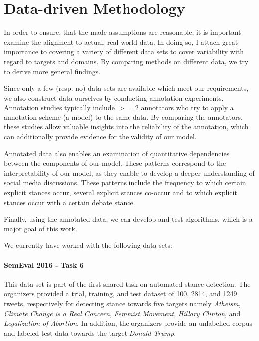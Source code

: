 \documentclass[11pt]{article}
\begin{document}
\section{Data-driven Methodology}

In order to ensure, that the made assumptions are reasonable, it is important examine the alignment to actual, real-world data.
In doing so, I attach great importance to covering a variety of different data sets to cover variability with regard to targets and domains.
By comparing methods on different data, we try to derive more general findings.

Since only a few (resp. no) data sets are available which meet our requirements, we also construct data ourselves by conducting annotation experiments.
Annotation studies typically include $>=2$ annotators who try to apply a annotation scheme (a model) to the same data.
By comparing the annotators, these studies allow valuable insights into the reliability of the annotation, which can additionally provide evidence for the validity of our model.

Annotated data also enables an examination of quantitative dependencies between the components of our model.
These patterns correspond to the interpretability of our model, as they enable to develop a deeper understanding of social media discussions.
These patterns include the frequency to which certain explicit stances occur, several explicit stances co-occur and to which explicit stances occur with a certain debate stance.

Finally, using the annotated data, we can develop and test algorithms, which is a major goal of this work.

We currently have worked with the following data sets:
\paragraph{SemEval 2016 - Task 6 \cite{mohammad2016stance}}

This data set is part of the first shared task on automated stance detection.
The organizers provided a trial, training, and test dataset of 100, 2814, and 1249 tweets, respectively for detecting stance towards five targets namely
\textit{Atheism}, \textit{Climate Change is a Real Concern}, \textit{Feminist Movement}, \textit{Hillary Clinton}, and \textit{Legalization of Abortion}.
In addition, the organizers provide an unlabelled corpus and labeled test-data towards the target \textit{Donald Trump}.
\end{document}
